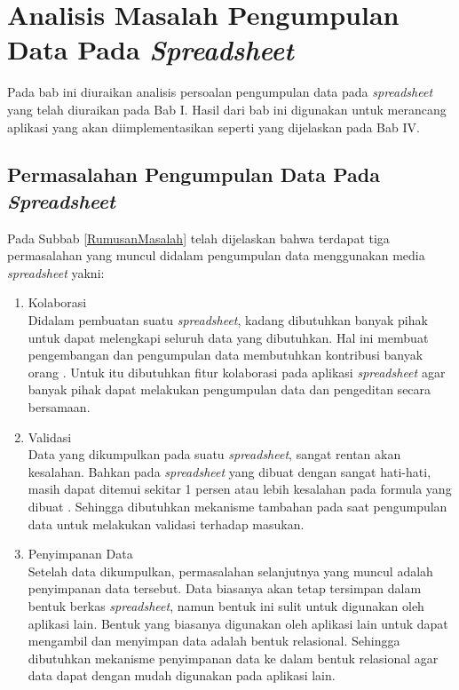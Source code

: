 \chapter{Analisis Masalah Pengumpulan Data Pada \textit{Spreadsheet}}

Pada bab ini diuraikan analisis persoalan pengumpulan data pada \textit{spreadsheet} yang telah diuraikan pada Bab I. Hasil dari bab ini digunakan untuk merancang aplikasi yang akan diimplementasikan seperti yang dijelaskan pada Bab IV.

\section{Permasalahan Pengumpulan Data Pada \textit{Spreadsheet}} \label{AspekAplikasi}
Pada Subbab \ref{RumusanMasalah} telah dijelaskan bahwa terdapat tiga permasalahan yang muncul didalam pengumpulan data menggunakan media \textit{spreadsheet} yakni:
\begin{enumerate}
	\item Kolaborasi \\
	Didalam pembuatan suatu \textit{spreadsheet}, kadang dibutuhkan banyak pihak untuk dapat melengkapi seluruh data yang dibutuhkan. Hal ini membuat pengembangan dan pengumpulan data membutuhkan kontribusi banyak orang \citep{Panko1998}. Untuk itu dibutuhkan fitur kolaborasi pada aplikasi \textit{spreadsheet} agar banyak pihak dapat melakukan pengumpulan data dan pengeditan secara bersamaan.
	\item Validasi \\
	Data yang dikumpulkan pada suatu \textit{spreadsheet}, sangat rentan akan kesalahan. Bahkan pada \textit{spreadsheet} yang dibuat dengan sangat hati-hati, masih dapat ditemui sekitar 1 persen atau lebih kesalahan pada formula yang dibuat \citep{Panko1998}. Sehingga dibutuhkan mekanisme tambahan pada saat pengumpulan data untuk melakukan validasi terhadap masukan.
	\item Penyimpanan Data \\
	Setelah data dikumpulkan, permasalahan selanjutnya yang muncul adalah penyimpanan data tersebut. Data biasanya akan tetap tersimpan dalam bentuk berkas \textit{spreadsheet}, namun bentuk ini sulit untuk digunakan oleh aplikasi lain. Bentuk yang biasanya digunakan oleh aplikasi lain untuk dapat mengambil dan menyimpan data adalah bentuk relasional. Sehingga dibutuhkan mekanisme penyimpanan data ke dalam bentuk relasional agar data dapat dengan mudah digunakan pada aplikasi lain.
\end{enumerate}

